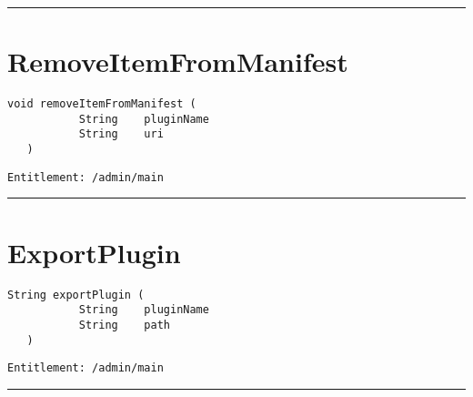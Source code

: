 \rule{12cm}{2pt}
\section{RemoveItemFromManifest}
\label{Api:RemoveItemFromManifest}
\begin{lstlisting}[style=nonumbers]
   void removeItemFromManifest (
           String    pluginName
           String    uri
   )
\end{lstlisting}
\begin{Verbatim}[formatcom=\color{Maroon}]
  Entitlement: /admin/main
\end{Verbatim}



\rule{12cm}{2pt}
\section{ExportPlugin}
\label{Api:ExportPlugin}
\begin{lstlisting}[style=nonumbers]
   String exportPlugin (
           String    pluginName
           String    path
   )
\end{lstlisting}
\begin{Verbatim}[formatcom=\color{Maroon}]
  Entitlement: /admin/main
\end{Verbatim}



\rule{12cm}{2pt}
